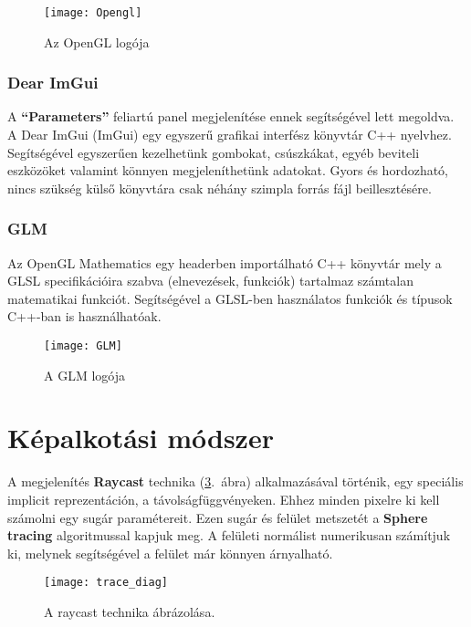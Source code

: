 \begin{figure}[H]
	\centering
	\texttt{[image: Opengl]}
	\caption{Az OpenGL logója}
	\label{fig:Opengl}
\end{figure}

\subsubsection{Dear ImGui}
A \textbf{``Parameters''} feliartú panel megjelenítése ennek segítségével lett megoldva. A Dear ImGui (ImGui) egy egyszerű grafikai interfész könyvtár C++ nyelvhez. Segítségével egyszerűen kezelhetünk gombokat, csúszkákat, egyéb beviteli eszközöket valamint könnyen megjeleníthetünk adatokat. Gyors és hordozható, nincs szükség külső könyvtára csak néhány szimpla forrás fájl beillesztésére. \cite{ocornuti13:online}

\subsubsection{GLM}

Az OpenGL Mathematics egy headerben importálható C++ könyvtár mely a GLSL specifikációira szabva (elnevezések, funkciók) tartalmaz számtalan matematikai funkciót. Segítségével a GLSL-ben használatos funkciók és típusok C++-ban is használhatóak. \cite{OpenGLMa34:online}

\begin{figure}[H]
	\centering
	\texttt{[image: GLM]}
	\caption{A GLM logója}
	\label{fig:GLM}
\end{figure}

\section{Képalkotási módszer}
\label{sec:kepmod}

A megjelenítés \textbf{Raycast} technika (\ref{fig:trace_diag}.~ábra) alkalmazásával történik, egy speciális implicit reprezentáción, a távolságfüggvényeken. Ehhez minden pixelre ki kell számolni egy sugár paramétereit. Ezen sugár és felület metszetét a \textbf{Sphere tracing} algoritmussal kapjuk meg. A felületi normálist numerikusan számítjuk ki, melynek segítségével a felület már könnyen árnyalható.

\begin{figure}[H]
	\centering
	\texttt{[image: trace\_diag]}
	\caption{A raycast technika ábrázolása. \cite{FileRayt97:online}}
	\label{fig:trace_diag}
\end{figure}

